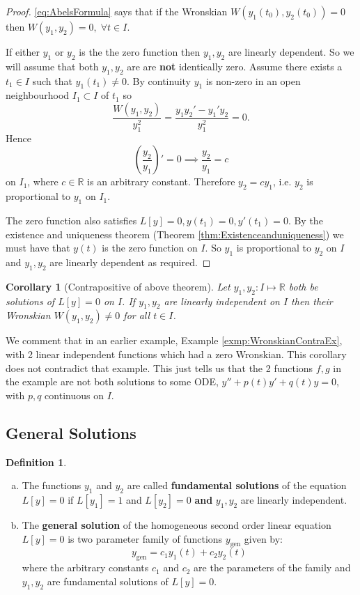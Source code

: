 \documentclass{article}
\theoremstyle{plain}
\newtheorem{cor}[thm]{Corollary}
\theoremstyle{definition}
\newtheorem{definition}[thm]{Definition}
\numberwithin{equation}{section}
\begin{document}
\begin{proof}
    \ref{eq:AbelsFormula} says that if the Wronskian $W(y_1(t_0), y_2(t_0)) = 0$ then $W(y_1,y_2)=0, \; \forall t \in I$.

    If either $y_1$ or $y_2$ is the the zero function then $y_1, y_2$ are linearly dependent. So we will assume that both $y_1,y_2$ are are \textbf{not} identically zero. Assume there exists a $t_1 \in I$ such that $y_1(t_1) \neq 0$. By continuity $y_1$ is non-zero in an open neighbourhood $I_1 \subset I$ of $t_1$ so
    \[
    \frac{W(y_1,y_2)}{y_1^2} = \frac{y_1y_2' - y_1'y_2}{y_1^2} = 0.
    \]
    Hence
    \[
        \left( \frac{y_2}{y_1} \right)' = 0 \implies \frac{y_2}{y_1} = c
    \]
    on $I_1$, where $c\in \mathbb{R}$ is an arbitrary constant. Therefore $y_2=cy_1$, i.e. $y_2$ is proportional to $y_1$ on $I_1$.

    The zero function also satisfies $L[y] = 0, y(t_1)=0, y'(t_1)=0.$ By the existence and uniqueness theorem (Theorem \ref{thm:Existenceanduniqueness}) we must have that $y(t)$ is the zero function on $I$. So $y_1$ is proportional to $y_2$ on $I$ and $y_1,y_2$ are linearly dependent as required.
\end{proof}

\begin{cor}[Contrapositive of above theorem]
    Let $y_1,y_2: I \mapsto \mathbb{R}$ both be solutions of $L[y]=0$ on $I$. If $y_1,y_2$ are linearly independent on $I$ then their Wronskian $W(y_1,y_2)\neq 0$ for all $t\in I$.
\end{cor}

We comment that in an earlier example, Example \ref{exmp:WronskianContraEx}, with 2 linear independent functions which had a zero Wronskian. This corollary does not contradict that example. This just tells us that the 2 functions $f,g$ in the example are not both solutions to some ODE, $y'' + p(t)y' + q(t)y=0$, with $p,q$ continuous on $I$.

\subsection{General Solutions}

\begin{definition}
\begin{enumerate}[(a)]\hfill
    \item
    The functions $y_1$ and $y_2$ are called \textbf{fundamental solutions} of the equation $L[y]=0$ if $L[y_1]=1$ and $L[y_2]=0$ \textbf{and} $y_1,y_2$ are linearly independent.
    \item
    The \textbf{general solution} of the homogeneous second order linear equation $L[y] = 0$ is two parameter family of functions $y_{\text{gen}}$ given by:
    \[
        y_{\text{gen}} = c_1y_1(t) + c_2y_2(t)
    \]
    where the arbitrary constants $c_1$ and $c_2$ are the parameters of the family and $y_1,y_2$ are fundamental solutions of $L[y]=0$.
\end{enumerate}
\end{definition}
\end{document}
